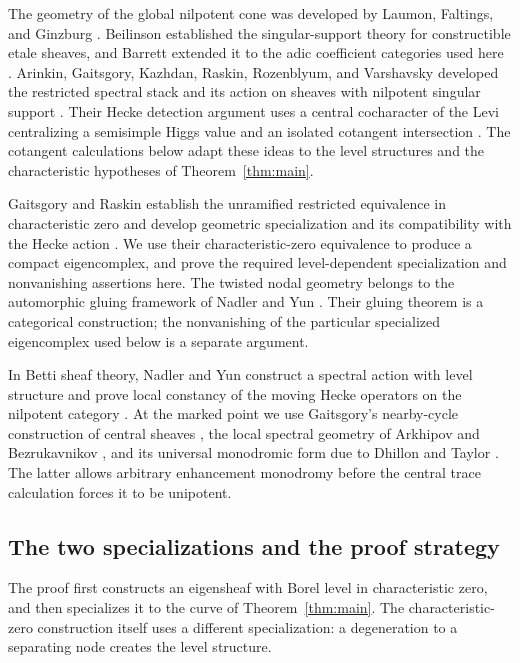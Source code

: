 The geometry of the global nilpotent cone was developed by Laumon,
Faltings, and Ginzburg \cite{LaumonNilpotent,Faltings,GinzburgNilpotent}.
Beilinson established the singular-support theory for constructible
etale sheaves, and Barrett extended it to the adic coefficient categories
used here \cite{Beilinson,Barrett}. Arinkin, Gaitsgory, Kazhdan, Raskin,
Rozenblyum, and Varshavsky developed the restricted spectral stack and
its action on sheaves with nilpotent singular support \cite{AGKRRV}.
Their Hecke detection argument uses a central cocharacter of the Levi
centralizing a semisimple Higgs value and an isolated cotangent
intersection \cite[\S\S20.5,20.7--20.8, Appendix~H]{AGKRRV}.
The cotangent calculations below adapt these ideas to the level structures
and the characteristic hypotheses of Theorem~\ref{thm:main}.

Gaitsgory and Raskin establish the unramified restricted equivalence in
characteristic zero and develop geometric specialization and its
compatibility with the Hecke action
\cite[Main Theorem~1.3.9,\S4]{GR}. We use their characteristic-zero
equivalence to produce a compact eigencomplex, and prove the required
level-dependent specialization and nonvanishing assertions here.
The twisted nodal geometry belongs to the automorphic gluing framework
of Nadler and Yun \cite[\S\S2--3]{NYAutomorphicGluing}. Their gluing theorem
is a categorical construction; the nonvanishing of the particular
specialized eigencomplex used below is a separate argument.

In Betti sheaf theory, Nadler and Yun construct a spectral action with
level structure and prove local constancy of the moving Hecke operators
on the nilpotent category
\cite[Theorems~6.2.2,6.3.7]{NY}. At the marked point we use Gaitsgory's
nearby-cycle construction of central sheaves \cite{GaitsgoryCentral},
the local spectral geometry of Arkhipov and Bezrukavnikov \cite{AB},
and its universal monodromic form due to Dhillon and Taylor \cite{DT}.
The latter allows arbitrary enhancement monodromy before the central
trace calculation forces it to be unipotent.

\subsection{The two specializations and the proof strategy}
The proof first constructs an eigensheaf with Borel level in characteristic
zero, and then specializes it to the curve of Theorem~\ref{thm:main}.
The characteristic-zero construction itself uses a different specialization:
a degeneration to a separating node creates the level structure.


